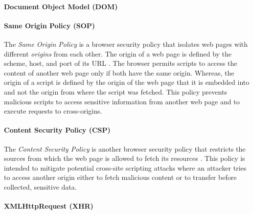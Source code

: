 \paragraph{Document Object Model (DOM)}

\paragraph{Same Origin Policy (SOP)}
	
	The \textit{Same Origin Policy} is a browser security policy that isolates web pages with different \textit{origins} from each other. The origin of a web page is defined by the scheme, host, and port of its URL \cite{w3cOriginSpecification}. The browser permits scripts to access the content of another web page only if both have the same origin. Whereas, the origin of a script is defined by the origin of the web page that it is embedded into and not the origin from where the script was fetched. This policy prevents malicious scripts to access sensitive information from another web page and to execute requests to cross-origins. 
	
	
\paragraph{Content Security Policy (CSP)}

	The \textit{Content Security Policy} is another browser security policy that restricts the sources from which the web page is allowed to fetch its resources \cite{w3cContentSecurityPolicySpecification}. This policy is intended to mitigate potential cross-site scripting attacks where an attacker tries to access another origin either to fetch malicious content or to transfer before collected, sensitive data. 

\paragraph{XMLHttpRequest (XHR)}



